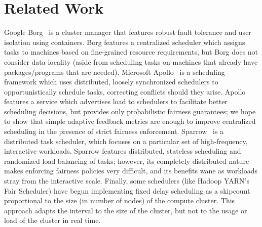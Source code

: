 \section{Related Work}\label{sec:related}
Google Borg~\cite{Verma2015} is a cluster manager that features robust fault tolerance and
user isolation using containers. Borg features a centralized scheduler which assigns tasks to machines 
based on fine-grained resource requirements, but Borg does not consider data locality (aside from scheduling
tasks on machines that already have packages/programs that are needed). 
Microsoft Apollo~\cite{Boutin2014} is a scheduling framework which uses distributed, 
loosely synchronized schedulers to opportunistically schedule tasks, correcting conflicts should they arise.
Apollo features a service which advertises load to schedulers to facilitate better scheduling decisions,
but provides only probabilistic fairness guarantees; we
hope to show that simple adaptive feedback metrics are enough to improve centralized scheduling in the presence
of strict fairness enforcement.
Sparrow~\cite{Ousterhout2013} is a distributed task scheduler, which focuses on a particular 
set of high-frequency, interactive workloads. Sparrow features distributed, stateless scheduling 
and randomized load balancing of tasks; however, its completely distributed nature makes enforcing
fairness policies very difficult, and its benefits wane as workloads stray from the interactive scale.
Finally, some schedulers (like Hadoop YARN's~\cite{Vavilapalli2013} Fair Scheduler) have begun implementing
fixed delay scheduling as a skipcount proportional to the size (in number of nodes) of the compute cluster. 
This approach adapts the interval to the size of the cluster, but not to the usage or load of the 
cluster in real time.
